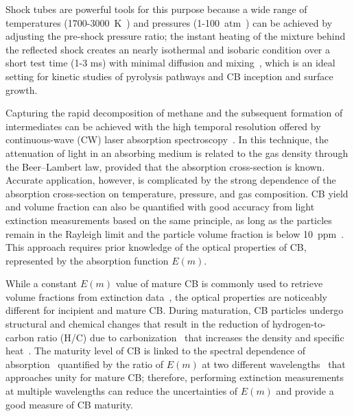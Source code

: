 Shock tubes are powerful tools for this purpose because a wide range of temperatures (1700-3000~K~\citep{agafonov2016unified}) and pressures (1-100~atm~\citep{shao2020shock}) can be achieved by adjusting the pre-shock pressure ratio; the instant heating of the mixture behind the reflected shock creates an nearly isothermal and isobaric condition over a short test time (1-3 ms) with minimal diffusion and mixing~\citep{eremin2012formation}, which is an ideal setting for kinetic studies of pyrolysis pathways and CB inception and surface growth.

Capturing the rapid decomposition of methane and the subsequent formation of intermediates can be achieved with the high temporal resolution offered by continuous-wave (CW) laser absorption spectroscopy~\citep{pinkowski2019multi}. In this technique, the attenuation of light in an absorbing medium is related to the gas density through the Beer–Lambert law, provided that the absorption cross-section is known. Accurate application, however, is complicated by the strong dependence of the absorption cross-section on temperature, pressure, and gas composition. CB yield and volume fraction can also be quantified with good accuracy from light extinction measurements based on the same principle, as long as the particles remain in the Rayleigh limit and the particle volume fraction is below 10~ppm~\citep{eremin2012formation}. This approach requires prior knowledge of the optical properties of CB, represented by the absorption function $E(m)$. 

While a constant $E(m)$ value of mature CB is commonly used to retrieve volume fractions from extinction data~\citep{de2008scattering, agafonov2016unified, utsav2017simultaneous}, the optical properties are noticeably different for incipient and mature CB. During maturation, CB particles undergo structural and chemical changes that result in the reduction of hydrogen-to-carbon ratio (H/C) due to carbonization~\cite{kholghy2016core} that increases the density and specific heat~\citep{michelsen2021effects}. The maturity level of CB is linked to the spectral dependence of absorption~\citep{bescond2016soot} quantified by the ratio of $E(m)$ at two different wavelengths~\citep{yon2021revealing} that approaches unity for mature CB; therefore, performing extinction measurements at multiple wavelengths can reduce the uncertainties of $E(m)$ and provide a good measure of CB maturity.

